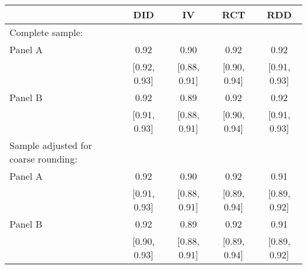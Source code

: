 \def\sym#1{\ifmmode^{#1}\else\(^{#1}\)\fi}
\begin{tabular}{l*{4}{c}}
\hline\hline
& \multicolumn{1}{c}{DID} &  \multicolumn{1}{c}{IV} &  \multicolumn{1}{c}{RCT} &  \multicolumn{1}{c}{RDD}\\

\hline
\hline

Complete sample:\\

Panel A & 0.92 &  0.90 &  0.92 &  0.92\\
& [0.92, 0.93] &  [0.88, 0.91] &  [0.90, 0.94] &  [0.91, 0.93]\\

Panel B & 0.92 &  0.89 &  0.92 &  0.92\\
& [0.91, 0.93] &  [0.88, 0.91] &  [0.90, 0.94] &  [0.91, 0.93]\\

Sample adjusted for coarse rounding:\\

Panel A & 0.92 &  0.90 &  0.92 &  0.91\\
& [0.91, 0.93] &  [0.88, 0.91] &  [0.89, 0.94] &  [0.89, 0.92]\\

Panel B & 0.92 &  0.89 &  0.92 &  0.91\\
& [0.90, 0.93] &  [0.88, 0.91] &  [0.89, 0.94] &  [0.89, 0.92]\\

\hline\hline
\end{tabular}

